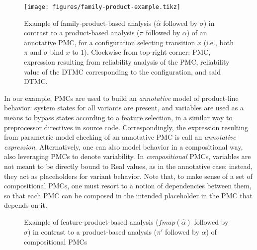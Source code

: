 \begin{figure}[!htbp]
	\centering
	\texttt{[image: figures/family-product-example.tikz]}
	\caption{
		Example of family-product-based analysis ($\hat{\alpha}$ followed by $\sigma$) in contrast to a
		product-based analysis ($\pi$ followed by $\alpha$) of an annotative PMC, for a configuration
		selecting transition $x$ (i.e., both $\pi$ and $\sigma$ bind $x$ to $1$).
		Clockwise from top-right corner: PMC, expression resulting from reliability analysis of the PMC, reliability value of the DTMC corresponding to the configuration, and said DTMC.
	}
	\label{fig:family-product-example}
\end{figure}

In our example, PMCs are used to build an \emph{annotative} model of product-line behavior:
system states for all variants are present, and variables are used as a means to bypass states according to a feature selection, in a similar way to preprocessor directives in source code.
Correspondingly, the expression resulting from parametric model checking of an annotative PMC is call an \emph{annotative expression}.
Alternatively, one can also model behavior in a compositional way, also leveraging PMCs to denote variability.
In \emph{compositional} PMCs, variables are not meant to be directly bound to Real values, as in the annotative case; instead, they act as placeholders for variant behavior.
Note that, to make sense of a set of compositional PMCs, one must resort to a notion of dependencies between them, so that each PMC can be composed in the intended placeholder in the PMC that depends on it.

\begin{figure}[!htbp]
	\centering
	\caption{%
		Example of feature-product-based analysis ($\mathit{fmap}(\hat{\alpha})$ followed by $\sigma$) in contrast to a
		product-based analysis ($\pi'$ followed by $\alpha$) of compositional PMCs%
	}
	\label{fig:feature-product-example}
\end{figure}

